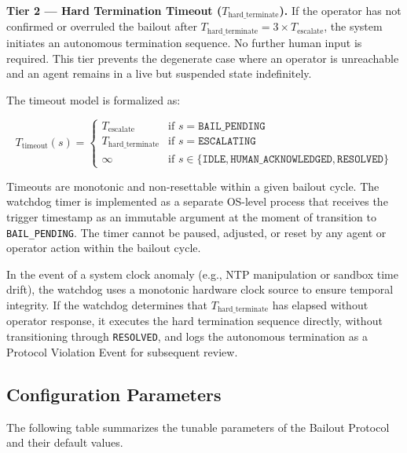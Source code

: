 \bigskip
\noindent\textbf{Tier 2 — Hard Termination Timeout ($T_{\text{hard\_terminate}}$).} If the operator has not confirmed or overruled the bailout after $T_{\text{hard\_terminate}} = 3 \times T_{\text{escalate}}$, the system initiates an autonomous termination sequence. No further human input is required. This tier prevents the degenerate case where an operator is unreachable and an agent remains in a live but suspended state indefinitely.

\bigskip
The timeout model is formalized as:

\[
T_{\text{timeout}}(s) =
\begin{cases}
T_{\text{escalate}} & \text{if } s = \texttt{BAIL\_PENDING} \\
T_{\text{hard\_terminate}} & \text{if } s = \texttt{ESCALATING} \\
\infty & \text{if } s \in \{ \texttt{IDLE}, \texttt{HUMAN\_ACKNOWLEDGED}, \texttt{RESOLVED} \}
\end{cases}
\]

Timeouts are monotonic and non-resettable within a given bailout cycle. The watchdog timer is implemented as a separate OS-level process that receives the trigger timestamp as an immutable argument at the moment of transition to \texttt{BAIL\_PENDING}. The timer cannot be paused, adjusted, or reset by any agent or operator action within the bailout cycle.

In the event of a system clock anomaly (e.g., NTP manipulation or sandbox time drift), the watchdog uses a monotonic hardware clock source to ensure temporal integrity. If the watchdog determines that $T_{\text{hard\_terminate}}$ has elapsed without operator response, it executes the hard termination sequence directly, without transitioning through \texttt{RESOLVED}, and logs the autonomous termination as a Protocol Violation Event for subsequent review.

\subsection{Configuration Parameters}

The following table summarizes the tunable parameters of the Bailout Protocol and their default values.


